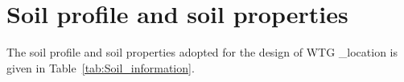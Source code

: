


\chapter{Soil profile and soil properties}\label{sec_1}
The soil profile and soil properties adopted for the design of WTG \ID_location is given in Table~\ref{tab:Soil_information}.

%  




